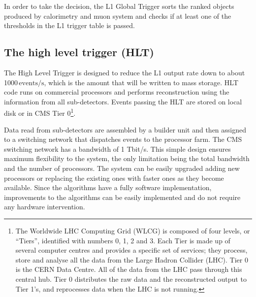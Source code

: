 In order to take the decision, the L1 Global Trigger sorts the ranked objects produced by calorimetry and muon system and checks if at least one of the thresholds in the L1 trigger table is passed.

\subsection{The high level trigger (HLT)}

The High Level Trigger is designed to reduce the L1 output rate down to about 1000\,$\mathrm{events/s}$, which is the amount that will be written to mass storage. HLT code runs on commercial processors and performs reconstruction using the information from all sub-detectors. Events passing
the HLT are stored on local disk or in CMS Tier 0\footnote{The Worldwide LHC Computing Grid (WLCG) is composed of four levels, or ``Tiers'', identified with numbers 0, 1, 2 and 3. Each Tier is made up of several computer centres and provides a specific set of services; they process, store and analyse all the data from the Large Hadron Collider (LHC). Tier 0 is the CERN Data Centre. All of the data from the LHC pass through this central hub. Tier 0 distributes the raw data and the reconstructed output to Tier 1's, and reprocesses data when the LHC is not running.}. 

Data read from sub-detectors are assembled by a builder unit and then assigned to a switching network that dispatches events to the processor farm. The CMS switching network has a bandwidth of 1 Tbit/s. This simple design ensures maximum flexibility to the system, the only limitation being the total bandwidth and the number of processors. The system can be easily upgraded adding new processors or replacing the existing ones with faster ones as they become available. Since the algorithms have a fully software implementation, improvements to the algorithms can be easily implemented and do not require any hardware intervention.

